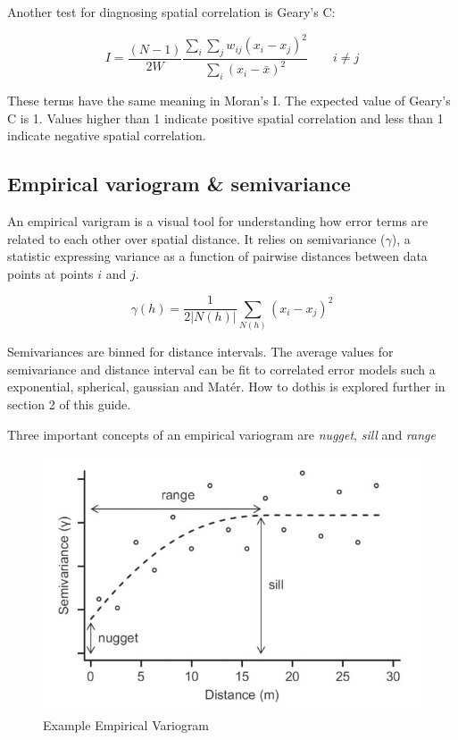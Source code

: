 \documentclass[]{book}
\begin{document}
Another test for diagnosing spatial correlation is Geary's C:

\[ I = \frac{(N -1)}{2W}\frac{\sum_i \sum_j w_{ij} (x_i - x_j)^2}{\sum_i(x_i - \bar{x})^2} \qquad i \neq j\]

These terms have the same meaning in Moran's I. The expected value of Geary's C is 1. Values higher than 1 indicate positive spatial correlation and less than 1 indicate negative spatial correlation.

\hypertarget{empirical-variogram-semivariance}{%
\subsection{Empirical variogram \& semivariance}\label{empirical-variogram-semivariance}}

An empirical varigram is a visual tool for understanding how error terms are related to each other over spatial distance. It relies on semivariance (\(\gamma\)), a statistic expressing variance as a function of pairwise distances between data points at points \(i\) and \(j\).

\[\gamma(h) = \frac{1}{2|N(h)|}\sum_{N(h)}(x_i - x_j)^2\]

Semivariances are binned for distance intervals. The average values for semivariance and distance interval can be fit to correlated error models such a exponential, spherical, gaussian and Matér. How to dothis is explored further in section 2 of this guide.

Three important concepts of an empirical variogram are \emph{nugget}, \emph{sill} and \emph{range}

\begin{figure}
\centering
\includegraphics{img/Sadoti2014_spherical.jpg}
\caption{Example Empirical Variogram}
\end{figure}
\end{document}
